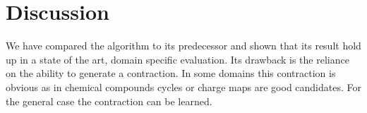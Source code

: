 \documentclass{article}
\begin{document}
\section{Discussion} 
We have compared the algorithm to its predecessor and shown
that its result hold up in a state of the art, domain specific
evaluation. Its drawback is the reliance on the ability to 
generate a contraction. In some domains this contraction is 
obvious as in chemical compounds cycles or charge maps are good candidates.
For the general case the contraction can be learned.



\end{document}
